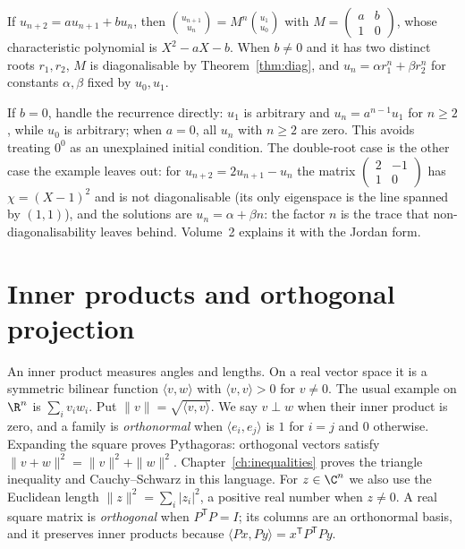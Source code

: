\begin{example}
If $u_{n+2}=au_{n+1}+bu_n$, then $\binom{u_{n+1}}{u_n}=M^n\binom{u_1}{u_0}$ with $M=\begin{pmatrix}a&b\\1&0\end{pmatrix}$, whose characteristic polynomial is $X^2-aX-b$.
When $b\ne0$ and it has two distinct roots $r_1,r_2$, $M$ is diagonalisable by Theorem~\ref{thm:diag}, and $u_n=\alpha r_1^n+\beta r_2^n$ for constants $\alpha,\beta$ fixed by $u_0,u_1$.
\end{example}

If $b=0$, handle the recurrence directly: $u_1$ is arbitrary and $u_n=a^{n-1}u_1$ for $n\ge2$, while $u_0$ is arbitrary; when $a=0$, all $u_n$ with $n\ge2$ are zero. This avoids treating $0^0$ as an unexplained initial condition. The double-root case is the other case the example leaves out: for $u_{n+2}=2u_{n+1}-u_n$ the matrix $\begin{pmatrix}2&-1\\1&0\end{pmatrix}$ has $\chi=(X-1)^2$ and is not diagonalisable (its only eigenspace is the line spanned by $(1,1)$), and the solutions are $u_n=\alpha+\beta n$: the factor $n$ is the trace that non-diagonalisability leaves behind. Volume~2 explains it with the Jordan form.

\section{Inner products and orthogonal projection}

An inner product measures angles and lengths. On a real vector space it is a symmetric bilinear function $\langle v,w\rangle$ with $\langle v,v\rangle>0$ for $v\ne0$. The usual example on $\R^n$ is $\sum_i v_iw_i$. Put $\|v\|=\sqrt{\langle v,v\rangle}$. We say $v\perp w$ when their inner product is zero, and a family is \emph{orthonormal} when $\langle e_i,e_j\rangle$ is $1$ for $i=j$ and $0$ otherwise. Expanding the square proves Pythagoras: orthogonal vectors satisfy $\|v+w\|^2=\|v\|^2+\|w\|^2$. Chapter~\ref{ch:inequalities} proves the triangle inequality and Cauchy--Schwarz in this language. For $z\in\C^n$ we also use the Euclidean length $\|z\|^2=\sum_i|z_i|^2$, a positive real number when $z\ne0$. A real square matrix is \emph{orthogonal} when $P^{\mathsf T}P=I$; its columns are an orthonormal basis, and it preserves inner products because $\langle Px,Py\rangle=x^{\mathsf T}P^{\mathsf T}Py$.

